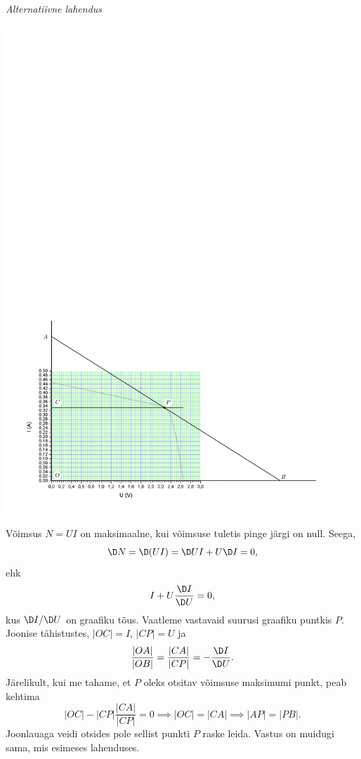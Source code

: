 {\textit{Alternatiivne lahendus}\\

\begin{center}
	\hspace{-0.1cm}\includegraphics[width=130mm]{2010-v3g-03-joonis_paneel_lah_2}
\end{center}

Võimsus $N = UI$ on maksimaalne, kui võimsuse tuletis pinge järgi on null. Seega,
\[
\D N = \D (UI) = \D UI + U\D I = 0,
\]
ehk
\[
I + U\frac{\D I}{\D U} = 0,
\]
kus $\D I/\D U$ on graafiku tõus. Vaatleme vastavaid suurusi graafiku puntkis $P$. Joonise tähistustes, $|OC| = I$, $|CP| = U$ ja
\[
\frac{|OA|}{|OB|} =
\frac{|CA|}{|CP|} = -\frac{\D I}{\D U}.
\]
Järelikult, kui me tahame, et
$P$ oleks otsitav võimsuse maksimumi punkt, peab kehtima
\[
|OC| - |CP|
\frac{|CA|}{|CP|} = 0 \implies |OC| = |CA| \implies |AP| = |PB|.
\]
Joonlauaga veidi otsides pole sellist punkti $P$ raske leida. Vastus on muidugi sama, mis esimeses lahenduses.
\fi
}